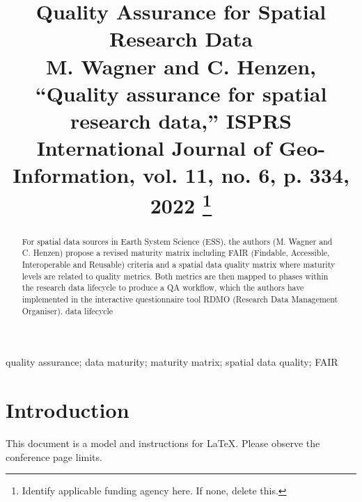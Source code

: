 \documentclass[conference]{IEEEtran}
\begin{document}
\title{Quality Assurance for Spatial Research Data\\
{\footnotesize M. Wagner and C. Henzen, “Quality assurance for spatial research data,”
ISPRS International Journal of Geo-Information, vol. 11, no. 6, p. 334,
2022}
\thanks{Identify applicable funding agency here. If none, delete this.}
}

\author{
\and
{}
\and
{}
}

\maketitle

\begin{abstract}
    For spatial data sources in Earth System Science (ESS), the authors (M. Wagner and C. Henzen) propose a revised maturity matrix including FAIR (Findable, Accessible, Interoperable and Reusable) criteria and a spatial data quality matrix where maturity levels are related to quality metrics. Both metrics are then mapped to phases within the research data lifecycle to produce a QA workflow, which the authors have implemented in the interactive questionnaire tool RDMO (Research Data Management Organiser). data lifecycle
\end{abstract}

\begin{IEEEkeywords}
quality assurance; data maturity; maturity matrix; spatial data quality; FAIR
\end{IEEEkeywords}

\section{Introduction}
This document is a model and instructions for \LaTeX.
Please observe the conference page limits. 
\end{document}
